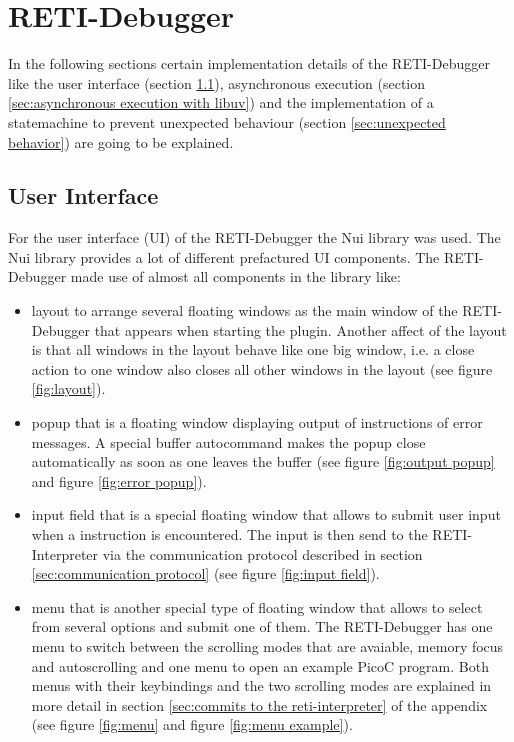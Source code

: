 \documentclass{report}
\begin{document}
\vspace{0.5cm}
\chapter{RETI-Debugger}
\label{ch:reti-debugger}

In the following sections certain implementation details of the RETI-Debugger like the user interface (section \ref{sec:user interface with nui}), asynchronous execution (section \ref{sec:asynchronous execution with libuv}) and the implementation of a statemachine to prevent unexpected behaviour (section \ref{sec:unexpected behavior}) are going to be explained.



\section{User Interface}
\label{sec:user interface with nui}

For the user interface (\alert{UI}) of the RETI-Debugger the \alert{Nui library}\cite{tanjimMunifTanjimNuiNvim2024} was used. The Nui library provides a lot of different prefactured UI components. The RETI-Debugger made use of almost all components in the library like:
\begin{itemize}
  \item \alert{layout} to arrange several floating windows as the main window of the RETI-Debugger that appears when starting the plugin. Another affect of the layout is that all windows in the layout behave like one big window, i.e. a close action to one window also closes all other windows in the layout (see figure \ref{fig:layout}).
  \item \alert{popup} that is a floating window displaying output of  instructions of error messages. A special buffer autocommand makes the popup close automatically as soon as one leaves the buffer (see figure \ref{fig:output popup} and figure \ref{fig:error popup}).
  \item \alert{input field} that is a special floating window that allows to submit user input when a  instruction is encountered. The input is then send to the RETI-Interpreter via the communication protocol described in section \ref{sec:communication protocol} (see figure \ref{fig:input field}).
  \item \alert{menu} that is another special type of floating window that allows to select from several options and submit one of them. The RETI-Debugger has one menu to switch between the \alert{scrolling modes} that are avaiable, \alert{memory focus} and \alert{autoscrolling} and one menu to open an example PicoC program. Both menus with their keybindings and the two scrolling modes are explained in more detail in section \ref{sec:commits to the reti-interpreter} of the appendix (see figure \ref{fig:menu} and figure \ref{fig:menu example}).
\end{itemize}
\end{document}
